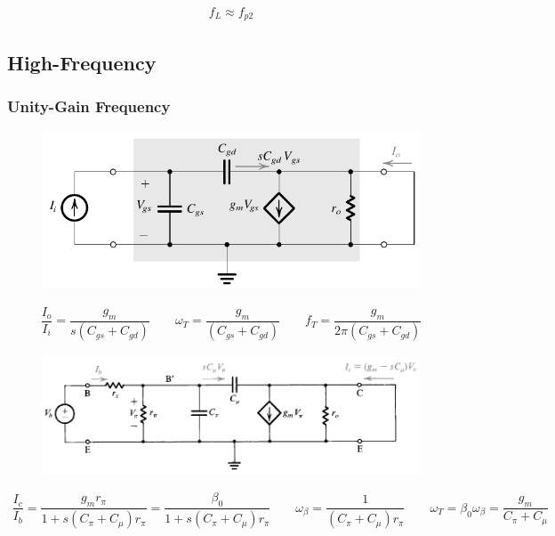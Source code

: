 \begin{equation*}
  \begin{aligned}
    f_L \approx f_{p2}
  \end{aligned}
\end{equation*}

\subsection{High-Frequency}

\subsubsection{Unity-Gain Frequency}


\begin{figure}[H]
  \centering
  \includegraphics[width=0.5\linewidth]{figures/Frequency-Response-UG-MOS}
\end{figure}

\begin{equation*}
  \begin{aligned}
    \dfrac{I_o}{I_i} = \dfrac{g_m}{s \left( C_{gs} + C_{gd} \right)}  \quad\quad \omega_T = \dfrac{g_m}{\left( C_{gs} + C_{gd} \right)} \quad\quad f_T = \dfrac{g_m}{2 \pi \left( C_{gs} + C_{gd} \right)} 
  \end{aligned}
\end{equation*}


\begin{figure}[H]
  \centering
  \includegraphics[width=0.7\linewidth]{figures/Frequency-Response-UG-BJT}
\end{figure}

\begin{equation*}
  \begin{aligned}
    \dfrac{I_c}{I_b} = \dfrac{g_m r_{\pi}}{1 + s \left( C_{\pi} + C_{\mu} \right) r_{\pi}} = \dfrac{\beta_0}{1 + s \left( C_{\pi} + C_{\mu} \right) r_{\pi}} \quad\quad \omega_{\beta} = \dfrac{1}{\left( C_{\pi} + C_{\mu} \right) r_{\pi}} \quad\quad \omega_T = \beta_0 \omega_{\beta} = \dfrac{g_m}{C_{\pi} + C_{\mu}}     
  \end{aligned}
\end{equation*}

